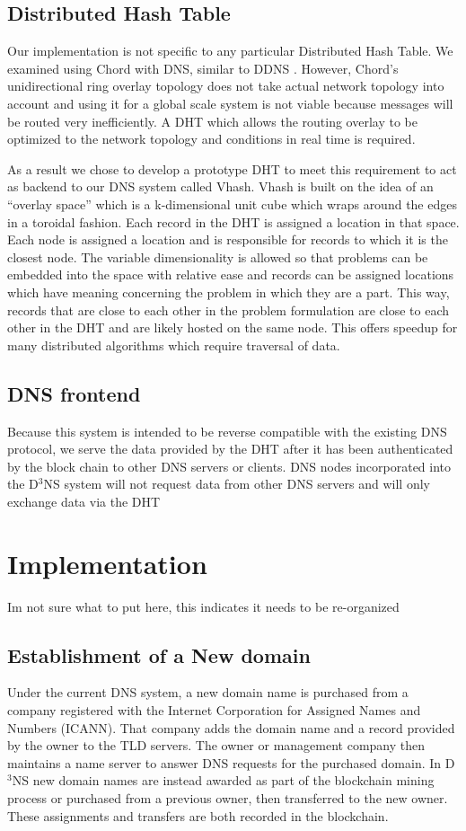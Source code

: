 \documentclass[11pt]{IEEEtran} %
\begin{document}
\subsection{Distributed Hash Table}
Our implementation is not specific to any particular Distributed Hash Table.  We examined using Chord \cite{chord} with DNS, similar to DDNS \cite{cox}.  However, Chord’s unidirectional ring overlay topology does not take actual network topology into account and using it for a global scale system is not viable because messages will be routed very inefficiently. A DHT which allows the routing overlay to be optimized to the network topology and conditions in real time is required.

As a result we chose to develop a prototype DHT to meet this requirement to act as backend to our DNS system called Vhash. Vhash is built on the idea of an “overlay space” which is a k-dimensional unit cube which wraps around the edges in a toroidal fashion. Each record in the DHT is assigned a location in that space. Each node is assigned a location and is responsible for records to which it is the closest node. The variable dimensionality is allowed so that problems can be embedded into the space with relative ease and records can be assigned locations which have meaning concerning the problem in which they are a part. This way, records that are close to each other in the problem formulation are close to each other in the DHT and are likely hosted on the same node. This offers speedup for many distributed algorithms which require traversal of data.



\subsection{DNS frontend}
Because this system is intended to be reverse compatible with the existing DNS protocol, we serve the data provided by the DHT after it has been authenticated by the block chain to other DNS servers or clients. DNS nodes incorporated into the D$^3$NS system will not request data from other DNS servers and will only exchange data via the DHT 

\section{Implementation}
Im not sure what to put here, this indicates it needs to be re-organized
\subsection{Establishment of a New domain}
Under the current DNS system, a new domain name is purchased from a company registered with the Internet Corporation for Assigned Names and Numbers (ICANN). That company adds the domain name and a record provided by the owner to the TLD servers. The owner or management company then maintains a name server to answer DNS requests for the purchased domain. In D$^{3}$NS new domain names are instead awarded as part of the blockchain mining process or purchased from a previous owner, then transferred to the new owner. These assignments and transfers are both recorded in the blockchain. 
\end{document}
